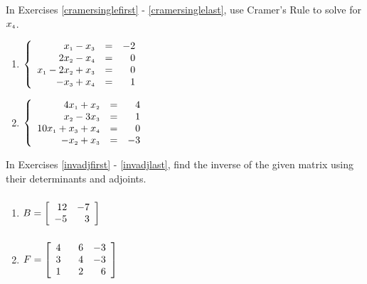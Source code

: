 In Exercises \ref{cramersinglefirst} - \ref{cramersinglelast},  use Cramer's Rule to solve for $x_{\mbox{\tiny$4$}}$.


\begin{multicols}{2}
\begin{enumerate}
\setcounter{enumi}{\value{HW}}

\item $\left\{ \begin{array}{rcr} x_{\mbox{\tiny$1$}} - x_{\mbox{\tiny$3$}} & = & -2 \\ 
2x_{\mbox{\tiny$2$}} - x_{\mbox{\tiny$4$}} & = & 0  \\  
x_{\mbox{\tiny$1$}} -  2x_{\mbox{\tiny$2$}} + x_{\mbox{\tiny$3$}} & = & 0 \\
-x_{\mbox{\tiny$3$}} + x_{\mbox{\tiny$4$}} & = & 1  \end{array} \right.$  \label{cramersinglefirst}

\item $\left\{ \begin{array}{rcr} 4x_{\mbox{\tiny$1$}} + x_{\mbox{\tiny$2$}} & = & 4 \\ 
x_{\mbox{\tiny$2$}} - 3x_{\mbox{\tiny$3$}} & = & 1  \\  
10x_{\mbox{\tiny$1$}} +x_{\mbox{\tiny$3$}} + x_{\mbox{\tiny$4$}} & = & 0 \\
-x_{\mbox{\tiny$2$}} + x_{\mbox{\tiny$3$}} & = & -3  \end{array} \right.$  \label{cramersinglelast}

\setcounter{HW}{\value{enumi}}
\end{enumerate}
\end{multicols}

\pagebreak

In Exercises \ref{invadjfirst} - \ref{invadjlast}, find the inverse of the given matrix using their determinants and adjoints.

\begin{multicols}{2}
\begin{enumerate}
\setcounter{enumi}{\value{HW}}

\item $B = \left[ \begin{array}{rr} 12 & -7 \\ -5 & 3 \end{array} \right] \vphantom{\left[ \begin{array}{rrr} 4 & \hphantom{-}6 & -3 \\ 3 & 4 & -3 \\ 1 & 2 & 6 \end{array} \right]}$ \label{invadjfirst}
\item $F = \left[ \begin{array}{rrr} 4 & \hphantom{-}6 & -3 \\ 3 & 4 & -3 \\ 1 & 2 & 6 \end{array} \right]$ \label{invadjlast}

\setcounter{HW}{\value{enumi}}
\end{enumerate}
\end{multicols}



